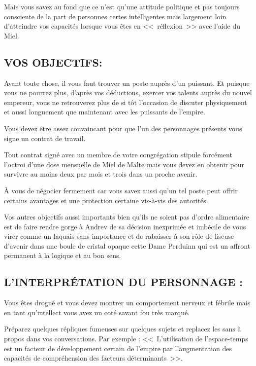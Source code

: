 \documentclass[14pt,twocolumn]{extarticle}
\begin{document}
Mais vous savez au fond que ce n'est qu'une attitude politique et pas toujours
consciente de la part de personnes certes intelligentes mais largement loin
d'atteindre vos capacités lorsque vous êtes en <<~réflexion~>> avec l'aide du
Miel.

\subsection{VOS OBJECTIFS:}

Avant toute chose, il vous faut trouver un poste auprès d'un puissant. Et
puisque vous ne pourrez plus, d'après vos déductions, exercer vos talents
auprès du nouvel empereur, vous ne retrouverez plus de si tôt l'occasion de
discuter physiquement et aussi longuement que maintenant avec les puissants de
l'empire.

Vous devez être assez convaincant pour que l'un des personnages présents vous
signe un contrat de travail.

Tout contrat signé avec un membre de votre congrégation stipule forcément
l'octroi d'une dose mensuelle de Miel de Malte mais vous devez en obtenir pour
survivre au moins deux par mois et trois dans un proche avenir.

À vous de négocier fermement car vous savez aussi qu'un tel poste peut offrir
certains avantages et une protection certaine vis-à-vis des autorités.

Vos autres objectifs aussi importants bien qu'ils ne soient pas d'ordre
alimentaire est de faire rendre gorge à Andrev de sa décision inexprimée et
imbécile de vous virer comme un laquais sans importance et de rabaisser à son
rôle de liseuse d'avenir dans une boule de cristal opaque cette Dame Perduinn
qui est un affront permanent à la logique et au bon sens.

\subsection{L'INTERPRÉTATION DU PERSONNAGE :}

Vous êtes drogué et vous devez montrer un comportement nerveux et fébrile mais
en tant qu'intellect vous avez un coté savant fou très marqué.

Préparez quelques répliques fumeuses sur quelques sujets et replacez les sans à
propos dans vos conversations. Par exemple : <<~L'utilisation de l'espace-temps
est un facteur de développement certain de l'empire par l'augmentation des
capacités de compréhension des facteurs déterminants~>>.
\end{document}
